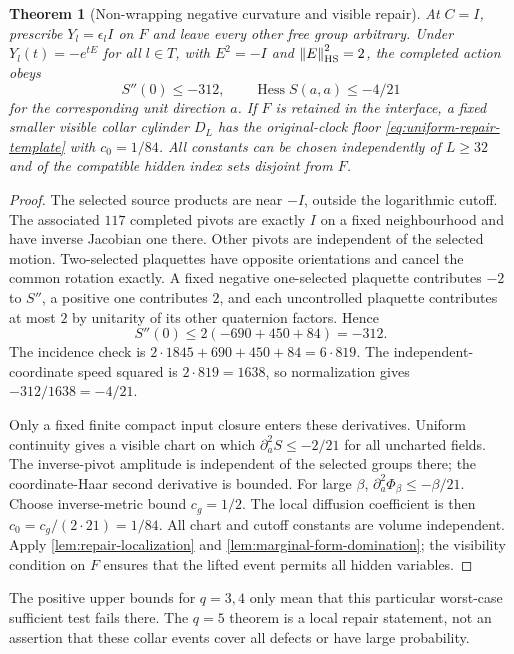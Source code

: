 \documentclass[11pt,oneside,openany]{book}
\newtheorem{theorem}{Theorem}[chapter]
\theoremstyle{definition}
\theoremstyle{remark}
\newcommand{\norm}[1]{\left\lVert#1\right\rVert}
\begin{document}
\begin{theorem}[Non-wrapping negative curvature and visible repair]
\label{thm:nonwrapping-repair}
At $C=I$, prescribe $Y_l=\epsilon_lI$ on $F$ and leave every other
free group arbitrary. Under $Y_l(t)=-e^{tE}$ for all $l\in T$, with
$E^2=-I$ and $\norm E_{\rm HS}^2=2$, the completed action obeys
\[
 S''(0)\le-312,\qquad
 \operatorname{Hess}S(a,a)\le-4/21
\]
for the corresponding unit direction $a$. If $F$ is retained in the
interface, a fixed smaller visible collar cylinder $D_L$ has the
original-clock floor \cref{eq:uniform-repair-template} with $c_0=1/84$.
All constants can be chosen independently of $L\ge32$ and of the
compatible hidden index sets disjoint from $F$.
\end{theorem}
\begin{proof}
The selected source products are near $-I$, outside the logarithmic
cutoff. The associated $117$ completed pivots are exactly $I$ on a
fixed neighbourhood and have inverse Jacobian one there. Other pivots
are independent of the selected motion. Two-selected plaquettes have
opposite orientations and cancel the common rotation exactly. A fixed
negative one-selected plaquette contributes $-2$ to $S''$, a positive
one contributes $2$, and each uncontrolled plaquette contributes at
most $2$ by unitarity of its other quaternion factors. Hence
\[
 S''(0)\le2(-690+450+84)=-312.
\]
The incidence check is $2\cdot1845+690+450+84=6\cdot819$.
The independent-coordinate speed squared is $2\cdot819=1638$, so
normalization gives $-312/1638=-4/21$.

Only a fixed finite compact input closure enters these derivatives.
Uniform continuity gives a visible chart on which
$\partial_a^2S\le-2/21$ for all uncharted fields. The inverse-pivot
amplitude is independent of the selected groups there; the
coordinate-Haar second derivative is bounded. For large $\beta$,
$\partial_a^2\Phi_\beta\le-\beta/21$. Choose inverse-metric bound
$c_g=1/2$. The local diffusion coefficient is then
$c_0=c_g/(2\cdot21)=1/84$. All chart and cutoff constants are
volume independent. Apply \cref{lem:repair-localization} and
\cref{lem:marginal-form-domination}; the visibility condition on $F$
ensures that the lifted event permits all hidden variables.
\end{proof}
The positive upper bounds for $q=3,4$ only mean that this particular
worst-case sufficient test fails there. The $q=5$ theorem is a local
repair statement, not an assertion that these collar events cover all
defects or have large probability.
\end{document}
